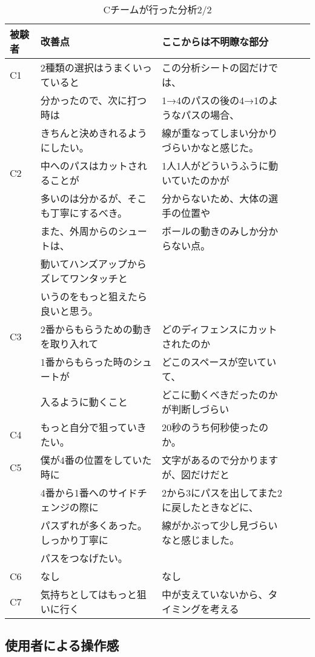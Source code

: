 \documentclass[../main.tex]{subfiles}
\begin{document}
\begin{table}[h]
  \caption{Cチームが行った分析2/2}\label{table:高校生の分析内容二つ目}
  \centering
  \begin{tabular}{lllll}
    \hline \hline
    被験者 & 改善点	 & ここからは不明瞭な部分	 \\
    \hline \hline
    C1&2種類の選択はうまくいっていると&この分析シートの図だけでは、\\
    &分かったので、次に打つ時は&1→4のパスの後の4→1のようなパスの場合、\\
    &きちんと決めきれるようにしたい。&線が重なってしまい分かりづらいかなと感じた。\\
    C2&中へのパスはカットされることが&1人1人がどういうふうに動いていたのかが\\
    &多いのは分かるが、そこも丁寧にするべき。&分からないため、大体の選手の位置や\\
    &また、外周からのシュートは、&ボールの動きのみしか分からない点。\\
    &動いてハンズアップからズレてワンタッチと&\\
    &いうのをもっと狙えたら良いと思う。&\\
    C3&2番からもらうための動きを取り入れて&どのディフェンスにカットされたのか\\
    &1番からもらった時のシュートが&どこのスペースが空いていて、\\
    &入るように動くこと&どこに動くべきだったのかが判断しづらい\\
    C4&もっと自分で狙っていきたい。&20秒のうち何秒使ったのか。\\
    C5&僕が4番の位置をしていた時に&文字があるので分かりますが、図だけだと\\
    &4番から1番へのサイドチェンジの際に&2から3にパスを出してまた2に戻したときなどに、\\
    &パスずれが多くあった。しっかり丁寧に&線がかぶって少し見づらいなと感じました。\\
    &パスをつなげたい。&\\
    C6&なし&なし\\
    C7&気持ちとしてはもっと狙いに行く&中が支えていないから、タイミングを考える\\
      \hline
    \end{tabular}
    \end{table}

\subsection{使用者による操作感}
\end{document}
